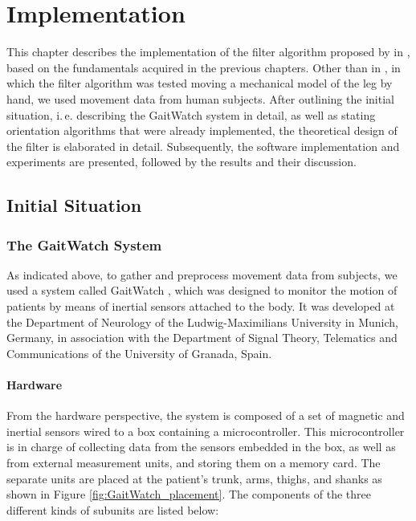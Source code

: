 \chapter{Implementation}
\label{ch:Implementation}

This chapter describes the implementation of the filter algorithm proposed by \citeauthor{bennett_motion_2014} in \cite{bennett_motion_2014}, based on the fundamentals acquired in the previous chapters. Other than in \cite{bennett_motion_2014}, in which the filter algorithm was tested moving a mechanical model of the leg by hand, we used movement data from human subjects. After outlining the initial situation, i.\,e. describing the GaitWatch system in detail, as well as stating orientation algorithms that were already implemented, the theoretical design of the filter is elaborated in detail. Subsequently, the software implementation and experiments are presented, followed by the results and their discussion.

\section{Initial Situation}\label{sec:initial_situation}

\subsection{The GaitWatch System}

As indicated above, to gather and preprocess movement data from subjects, we used a system called GaitWatch \cite{olivares_vicente_gaitwatch_2013}, which was designed to monitor the motion of patients by means of inertial sensors attached to the body. It was developed at the Department of Neurology of the Ludwig-Maximilians University in Munich, Germany, in association with the Department of Signal Theory, Telematics and Communications of the University of Granada, Spain.

\subsubsection{Hardware}

From the hardware perspective, the system is composed of a set of magnetic and inertial sensors wired to a box containing a microcontroller. This microcontroller is in charge of collecting data from the sensors embedded in the box, as well as from  external measurement units, and storing them on a memory card. The separate units are placed at the patient's trunk, arms, thighs, and shanks as shown in Figure \ref{fig:GaitWatch_placement}. The components of the three different kinds of subunits are listed below:

